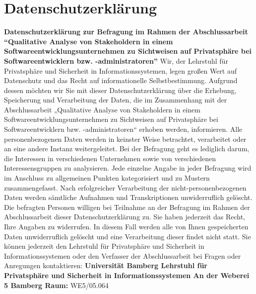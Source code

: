 \section{Datenschutzerklärung} \label{erklaerung}
\textbf{Datenschutzerklärung zur Befragung im Rahmen der Abschlussarbeit \enquote{Qualitative Analyse von Stakeholdern in einem Softwareentwicklungsunternehmen zu Sichtweisen auf Privatsphäre bei Softwareentwicklern bzw. -administratoren}} \newline \newline
Wir, der Lehrstuhl für Privatsphäre und Sicherheit in Informationssystemen, legen großen Wert auf Datenschutz und das Recht auf informationelle Selbstbestimmung. Aufgrund dessen möchten wir Sie mit dieser Datenschutzerklärung über die Erhebung, Speicherung und Verarbeitung der Daten, die im Zusammenhang mit der Abschlussarbeit „Qualitative Analyse von Stakeholdern in einem Softwareentwicklungsunternehmen zu Sichtweisen auf Privatsphäre bei Softwareentwicklern bzw. -administratoren“ erhoben werden, informieren. \newline \newline
Alle personenbezogenen Daten werden in keinster Weise betrachtet, verarbeitet oder an eine andere Instanz weitergeleitet. Bei der Befragung geht es lediglich darum, die Interessen in verschiedenen Unternehmen sowie von verschiedenen Interessensgruppen zu analysieren. Jede einzelne Angabe in jeder Befragung wird im Anschluss zu allgemeinen Punkten kategorisiert und zu Mustern zusammengefasst. Nach erfolgreicher Verarbeitung der nicht-personenbezogenen Daten werden sämtliche Aufnahmen und Transkriptionen unwiderruflich gelöscht. \newline \newline
Die befragten Personen willigen bei Teilnahme an der Befragung im Rahmen der Abschlussarbeit dieser Datenschutzerklärung zu. Sie haben jederzeit das Recht, Ihre Angaben zu widerrufen. In diesem Fall werden alle von Ihnen gespeicherten Daten unwiderruflich gelöscht und eine Verarbeitung dieser findet nicht statt. \newline \newline
Sie können jederzeit den Lehrstuhl für Privatsphäre und Sicherheit in Informationssystemen oder den Verfasser der Abschlussarbeit bei Fragen oder Anregungen kontaktieren: \newline \newline
\textbf{Universität Bamberg\newline
Lehrstuhl für Privatsphäre und Sicherheit in Informationssystemen An der Weberei 5 Bamberg\newline \newline
Raum:} WE5/05.064\newline

